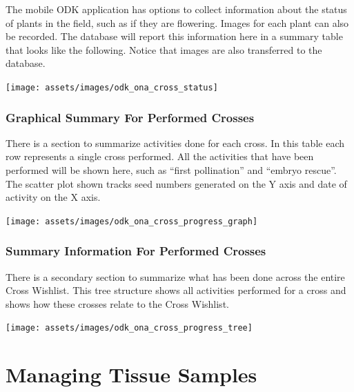 \documentclass[
  12pt,
]{book}
\begin{document}
The mobile ODK application has options to collect information about the status of plants in the field, such as if they are flowering. Images for each plant can also be recorded. The database will report this information here in a summary table that looks like the following. Notice that images are also transferred to the database.

\begin{center}\texttt{[image: assets/images/odk\_ona\_cross\_status]} \end{center}

\hypertarget{graphical-summary-for-performed-crosses}{%
\subsection{Graphical Summary For Performed Crosses}\label{graphical-summary-for-performed-crosses}}

There is a section to summarize activities done for each cross. In this table each row represents a single cross performed. All the activities that have been performed will be shown here, such as ``first pollination'' and ``embryo rescue''. The scatter plot shown tracks seed numbers generated on the Y axis and date of activity on the X axis.

\begin{center}\texttt{[image: assets/images/odk\_ona\_cross\_progress\_graph]} \end{center}

\hypertarget{summary-information-for-performed-crosses}{%
\subsection{Summary Information For Performed Crosses}\label{summary-information-for-performed-crosses}}

There is a secondary section to summarize what has been done across the entire Cross Wishlist. This tree structure shows all activities performed for a cross and shows how these crosses relate to the Cross Wishlist.

\begin{center}\texttt{[image: assets/images/odk\_ona\_cross\_progress\_tree]} \end{center}

\hypertarget{managing-tissue-samples}{%
\chapter{Managing Tissue Samples}\label{managing-tissue-samples}}
\end{document}

